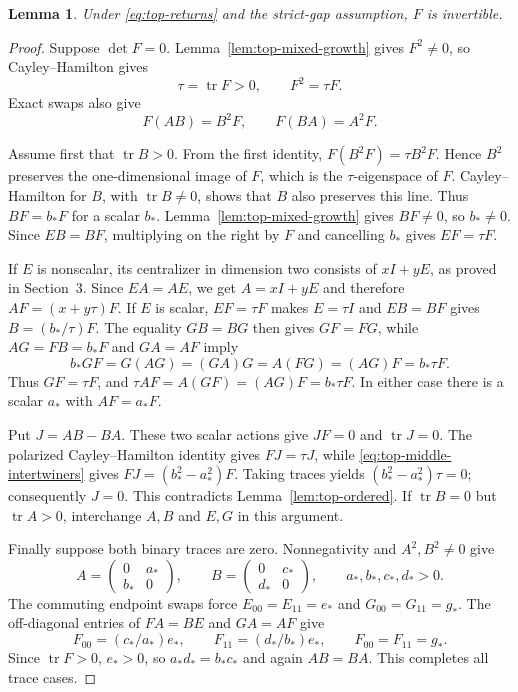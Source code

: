 \documentclass[11pt,a4paper]{article}
\newtheorem{lemma}[theorem]{Lemma}
\newcommand{\tr}{\operatorname{tr}}
\begin{document}
\begin{lemma}\label{lem:top-middle-invertible}
Under \eqref{eq:top-returns} and the strict-gap assumption, $F$ is
invertible.
\end{lemma}
\begin{proof}
Suppose $\det F=0$. Lemma~\ref{lem:top-mixed-growth} gives $F^2\ne0$,
so Cayley--Hamilton gives
\[
\tau=\tr F>0,\qquad F^2=\tau F.
\]
Exact swaps also give
\begin{equation}\label{eq:top-middle-intertwiners}
F(AB)=B^2F,\qquad F(BA)=A^2F.
\end{equation}

Assume first that $\tr B>0$. From the first identity,
$F(B^2F)=\tau B^2F$. Hence $B^2$ preserves the one-dimensional
image of $F$, which is the $\tau$-eigenspace of $F$.
Cayley--Hamilton for $B$, with $\tr B\ne0$, shows that $B$ also
preserves this line. Thus $BF=b_*F$ for a scalar $b_*$.
Lemma~\ref{lem:top-mixed-growth} gives $BF\ne0$, so $b_*\ne0$.
Since $EB=BF$, multiplying on the right by $F$ and cancelling $b_*$
gives $EF=\tau F$.

If $E$ is nonscalar, its centralizer in dimension two consists of
$xI+yE$, as proved in Section~3. Since $EA=AE$, we get
$A=xI+yE$ and therefore $AF=(x+y\tau)F$.
If $E$ is scalar, $EF=\tau F$ makes $E=\tau I$ and
$EB=BF$ gives $B=(b_*/\tau)F$. The equality $GB=BG$ then gives
$GF=FG$, while $AG=FB=b_*F$ and $GA=AF$ imply
\[
b_*GF=G(AG)=(GA)G=A(FG)=(AG)F=b_*\tau F.
\]
Thus $GF=\tau F$, and $\tau AF=A(GF)=(AG)F=b_*\tau F$.
In either case there is a scalar $a_*$ with $AF=a_*F$.

Put $J=AB-BA$. These two scalar actions give $JF=0$ and
$\tr J=0$. The polarized Cayley--Hamilton identity gives
$FJ=\tau J$, while \eqref{eq:top-middle-intertwiners} gives
$FJ=(b_*^2-a_*^2)F$. Taking traces yields
$(b_*^2-a_*^2)\tau=0$; consequently $J=0$.
This contradicts Lemma~\ref{lem:top-ordered}.
If $\tr B=0$ but $\tr A>0$, interchange $A,B$ and $E,G$
in this argument.

Finally suppose both binary traces are zero. Nonnegativity and
$A^2,B^2\ne0$ give
\[
A=\begin{pmatrix}0&a_*\\b_*&0\end{pmatrix},\qquad
B=\begin{pmatrix}0&c_*\\d_*&0\end{pmatrix},
\qquad a_*,b_*,c_*,d_*>0.
\]
The commuting endpoint swaps force
$E_{00}=E_{11}=e_*$ and $G_{00}=G_{11}=g_*$.
The off-diagonal entries of $FA=BE$ and $GA=AF$ give
\[
F_{00}=(c_*/a_*)e_*,\qquad
F_{11}=(d_*/b_*)e_*,\qquad F_{00}=F_{11}=g_*.
\]
Since $\tr F>0$, $e_*>0$, so $a_*d_*=b_*c_*$ and again
$AB=BA$. This completes all trace cases.
\end{proof}
\end{document}
